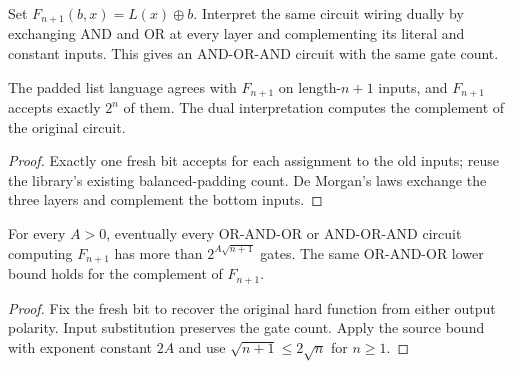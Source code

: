 \begin{definition}
  \label{def:circuits-openai-balanced}
  \leanok
  Set $F_{n+1}(b,x)=L(x)\mathbin\oplus b$. Interpret the same circuit wiring
  dually by exchanging AND and OR at every layer and complementing its
  literal and constant inputs. This gives an AND-OR-AND circuit with the
  same gate count.
\end{definition}

\begin{theorem}
  \label{thm:circuits-openai-balanced}
  \leanok
  The padded list language agrees with $F_{n+1}$ on length-$n+1$ inputs,
  and $F_{n+1}$ accepts exactly $2^n$ of them. The dual interpretation
  computes the complement of the original circuit.
\end{theorem}
\begin{proof}
  \leanok
  Exactly one fresh bit accepts for each assignment to the old inputs;
  reuse the library's existing balanced-padding count. De Morgan's laws
  exchange the three layers and complement the bottom inputs.
\end{proof}

\begin{corollary}
  \label{cor:circuits-openai-balanced-both-polarities}
  \leanok
  For every $A>0$, eventually every OR-AND-OR or AND-OR-AND circuit computing
  $F_{n+1}$ has more than $2^{A\sqrt{n+1}}$ gates. The same OR-AND-OR lower
  bound holds for the complement of $F_{n+1}$.
\end{corollary}
\begin{proof}
  \leanok
  Fix the fresh bit to recover the original hard function from either
  output polarity. Input substitution preserves the gate count. Apply the
  source bound with exponent constant $2A$ and use
  $\sqrt{n+1}\le2\sqrt n$ for $n\ge1$.
\end{proof}


